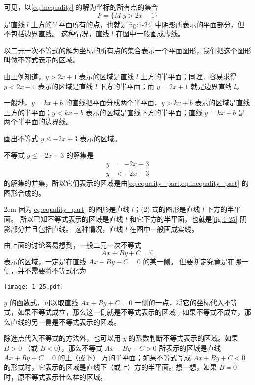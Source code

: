 \medskip
可见，以\cref{eq:inequality} 的解为坐标的所有点的集合
\[P=\{M|y>2x+1\}\]
是直线 $l$ 上方的半平面所有的点，也就是\cref{fig:1-24} 中阴影所表示的平面部分，但不包括边界直线。
这种情况，直线 $l$ 在图中一般画成虚线。

以二元一次不等式的解为坐标的所有点的集合表示一个平面图形，我们把这个图形叫做不等式表示的区域。

由上例知道，$y>2x+1$ 表示的区域是直线 $l$ 上方的半平面；同理，容易求得 $y<2x+1$ 表示的区域是直线 $l$ 下方的半平面；而 $y=2x+1$ 就是边界直线 $l$。

一般地，$y=kx+b$ 的直线把平面分成两个半平面，$y>kx+b$ 表示的区域是直线上方的半平面；$y<kx+b$ 表示的区域是直线下方的半平面；直线 $y=kx+b$ 是两个半平面的边界线。

\begin{example}
  画出不等式 $y\leqslant-2x+3$ 表示的区域。
\end{example}
\begin{solution}
  不等式 $y\leqslant-2x+3$ 的解集是
  \begin{align}
    \label{eq:equality_part}   y & = -2x+3\\
    \label{eq:inequality_part} y & < -2x+3
  \end{align}
  的解集的并集，所以它们表示的区域是由\cref{eq:equality_part,eq:inequality_part} 的图形合成的。

\medskip\noindent
\begin{minipage}{0.65\linewidth}\parindent2em
  因为\cref{eq:equality_part} 的图形是直线 $l$；(2) 式的图形是直线 $l$ 下方的半平面。
  所以已知不等式表示的区域是直线 $l$ 和它下方的半平面，也就是\cref{fig:1-25} 阴影部分并且包括直线。
  这种情况，直线 $l$ 在图中一般画成实线。

  由上面的讨论容易想到，一般二元一次不等式
\[ Ax+By+C=0\]
表示的区域，一定是在直线 $Ax+By+C=0$ 的某一侧。
但要断定究竟是在哪一侧，并不需要将不等式化为 
\end{minipage}\hfill
\begin{minipage}{0.3\linewidth}\centering
  \begin{figurehere}
    \texttt{[image: 1-25.pdf]}
    \caption{}\label{fig:1-25}
  \end{figurehere}
\end{minipage}

\medskip\noindent
$y$ 的函数式，可以取直线 $Ax+By+C=0$ 一侧的一点，将它的坐标代入不等式，如果不等式成立，那么这一侧就是不等式表示的区域；如果不等式不成立，那么直线的另一侧是不等式表示的区域。

除选点代入不等式的方法外，也可以用 $y$ 的系数判断不等式表示的区域。如果 $B>0$ （或 $B<0$），那么不等式 $Ax+By+C>0$ 所表示的区域是直线 $Ax+By+C=0$ 的上（或下） 方的半平面；如果不等式写成  $Ax+By+C<0$ 的形式时，它表示的区域是直线下（或上）方的半平面。想一想，如果 $B=0$ 时，原不等式表示什么样的区域。
\end{solution}

